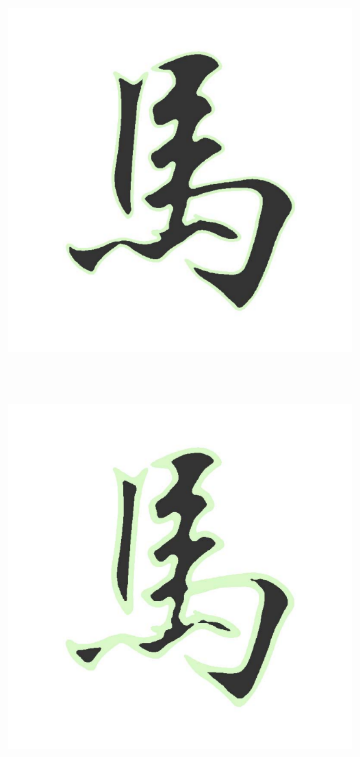 \documentclass[annual]{acmsiggraph}
\begin{document}
\begin{figure}
\begin{subfigure}[b]{0.18\linewidth}
        \end{subfigure}
        ~
		\begin{subfigure}[b]{0.18\linewidth}
                \centering
                \includegraphics[width=\textwidth]{images/horse/horse-contour-0d25.pdf}
        \end{subfigure}
		~
		\begin{subfigure}[b]{0.18\linewidth}
                \centering
                \includegraphics[width=\textwidth]{images/horse/horse-contour-0d5.pdf}

\end{subfigure}
\end{figure}
\end{document}
